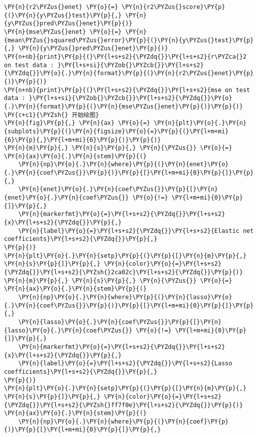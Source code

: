 \begin{Verbatim}[commandchars=\\\{\}]
\PY{n}{r2\PYZus{}enet} \PY{o}{=} \PY{n}{r2\PYZus{}score}\PY{p}{(}\PY{n}{y\PYZus{}test}\PY{p}{,} \PY{n}{y\PYZus{}pred\PYZus{}enet}\PY{p}{)}
\PY{n}{mse\PYZus{}enet} \PY{o}{=} \PY{n}{mean\PYZus{}squared\PYZus{}error}\PY{p}{(}\PY{n}{y\PYZus{}test}\PY{p}{,} \PY{n}{y\PYZus{}pred\PYZus{}enet}\PY{p}{)}
\PY{n+nb}{print}\PY{p}{(}\PY{l+s+s2}{\PYZdq{}}\PY{l+s+s2}{r\PYZca{}2 on test data : }\PY{l+s+si}{\PYZob{}\PYZcb{}}\PY{l+s+s2}{\PYZdq{}}\PY{o}{.}\PY{n}{format}\PY{p}{(}\PY{n}{r2\PYZus{}enet}\PY{p}{)}\PY{p}{)}
\PY{n+nb}{print}\PY{p}{(}\PY{l+s+s2}{\PYZdq{}}\PY{l+s+s2}{mse on test data : }\PY{l+s+si}{\PYZob{}\PYZcb{}}\PY{l+s+s2}{\PYZdq{}}\PY{o}{.}\PY{n}{format}\PY{p}{(}\PY{n}{mse\PYZus{}enet}\PY{p}{)}\PY{p}{)}
\PY{c+c1}{\PYZsh{} 开始绘图}
\PY{n}{fig}\PY{p}{,} \PY{n}{ax} \PY{o}{=} \PY{n}{plt}\PY{o}{.}\PY{n}{subplots}\PY{p}{(}\PY{n}{figsize}\PY{o}{=}\PY{p}{(}\PY{l+m+mi}{6}\PY{p}{,}\PY{l+m+mi}{6}\PY{p}{)}\PY{p}{)}
\PY{n}{m}\PY{p}{,} \PY{n}{s}\PY{p}{,} \PY{n}{\PYZus{}} \PY{o}{=} \PY{n}{ax}\PY{o}{.}\PY{n}{stem}\PY{p}{(}
    \PY{n}{np}\PY{o}{.}\PY{n}{where}\PY{p}{(}\PY{n}{enet}\PY{o}{.}\PY{n}{coef\PYZus{}}\PY{p}{)}\PY{p}{[}\PY{l+m+mi}{0}\PY{p}{]}\PY{p}{,}
    \PY{n}{enet}\PY{o}{.}\PY{n}{coef\PYZus{}}\PY{p}{[}\PY{n}{enet}\PY{o}{.}\PY{n}{coef\PYZus{}} \PY{o}{!=} \PY{l+m+mi}{0}\PY{p}{]}\PY{p}{,}
    \PY{n}{markerfmt}\PY{o}{=}\PY{l+s+s2}{\PYZdq{}}\PY{l+s+s2}{x}\PY{l+s+s2}{\PYZdq{}}\PY{p}{,}
    \PY{n}{label}\PY{o}{=}\PY{l+s+s2}{\PYZdq{}}\PY{l+s+s2}{Elastic net coefficients}\PY{l+s+s2}{\PYZdq{}}\PY{p}{,}
\PY{p}{)}
\PY{n}{plt}\PY{o}{.}\PY{n}{setp}\PY{p}{(}\PY{p}{[}\PY{n}{m}\PY{p}{,} \PY{n}{s}\PY{p}{]}\PY{p}{,} \PY{n}{color}\PY{o}{=}\PY{l+s+s2}{\PYZdq{}}\PY{l+s+s2}{\PYZsh{}2ca02c}\PY{l+s+s2}{\PYZdq{}}\PY{p}{)}
\PY{n}{m}\PY{p}{,} \PY{n}{s}\PY{p}{,} \PY{n}{\PYZus{}} \PY{o}{=} \PY{n}{ax}\PY{o}{.}\PY{n}{stem}\PY{p}{(}
    \PY{n}{np}\PY{o}{.}\PY{n}{where}\PY{p}{(}\PY{n}{lasso}\PY{o}{.}\PY{n}{coef\PYZus{}}\PY{p}{)}\PY{p}{[}\PY{l+m+mi}{0}\PY{p}{]}\PY{p}{,}
    \PY{n}{lasso}\PY{o}{.}\PY{n}{coef\PYZus{}}\PY{p}{[}\PY{n}{lasso}\PY{o}{.}\PY{n}{coef\PYZus{}} \PY{o}{!=} \PY{l+m+mi}{0}\PY{p}{]}\PY{p}{,}
    \PY{n}{markerfmt}\PY{o}{=}\PY{l+s+s2}{\PYZdq{}}\PY{l+s+s2}{x}\PY{l+s+s2}{\PYZdq{}}\PY{p}{,}
    \PY{n}{label}\PY{o}{=}\PY{l+s+s2}{\PYZdq{}}\PY{l+s+s2}{Lasso coefficients}\PY{l+s+s2}{\PYZdq{}}\PY{p}{,}
\PY{p}{)}
\PY{n}{plt}\PY{o}{.}\PY{n}{setp}\PY{p}{(}\PY{p}{[}\PY{n}{m}\PY{p}{,} \PY{n}{s}\PY{p}{]}\PY{p}{,} \PY{n}{color}\PY{o}{=}\PY{l+s+s2}{\PYZdq{}}\PY{l+s+s2}{\PYZsh{}ff7f0e}\PY{l+s+s2}{\PYZdq{}}\PY{p}{)}
\PY{n}{ax}\PY{o}{.}\PY{n}{stem}\PY{p}{(}
    \PY{n}{np}\PY{o}{.}\PY{n}{where}\PY{p}{(}\PY{n}{coef}\PY{p}{)}\PY{p}{[}\PY{l+m+mi}{0}\PY{p}{]}\PY{p}{,}

\end{Verbatim}

